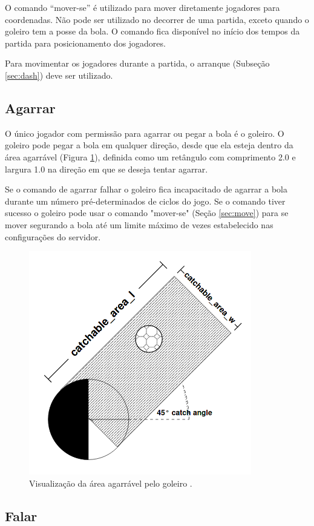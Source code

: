 O comando ``mover-se'' é utilizado para mover diretamente jogadores para coordenadas. Não pode ser utilizado no decorrer de uma partida, exceto quando o goleiro tem a posse da bola. O comando fica disponível no início dos tempos da partida para posicionamento dos jogadores.

Para movimentar os jogadores durante a partida, o arranque (Subseção \ref{sec:dash}) deve ser utilizado.

\subsection{Agarrar}

O único jogador com permissão para agarrar ou pegar a bola é o goleiro. O goleiro pode pegar a bola em qualquer direção, desde que ela esteja dentro da área agarrável (Figura \ref{fig:catch}), definida como um retângulo com comprimento 2.0 e largura 1.0 na direção em que se deseja tentar agarrar.

Se o comando de agarrar falhar o goleiro fica incapacitado de agarrar a bola durante um número pré-determinados de ciclos do jogo. Se o comando tiver sucesso o goleiro pode usar o comando "mover-se" (Seção \ref{sec:move}) para se mover segurando a bola até um limite máximo de vezes estabelecido nas configurações do servidor.

\begin{figure}[H]
	\includegraphics[width=0.5\linewidth]{figs/catch.png}
	\centering
	\caption{Visualização da área agarrável pelo goleiro \cite{rcssmanual2003}.}
	\label{fig:catch}
\end{figure}

\subsection{Falar}

